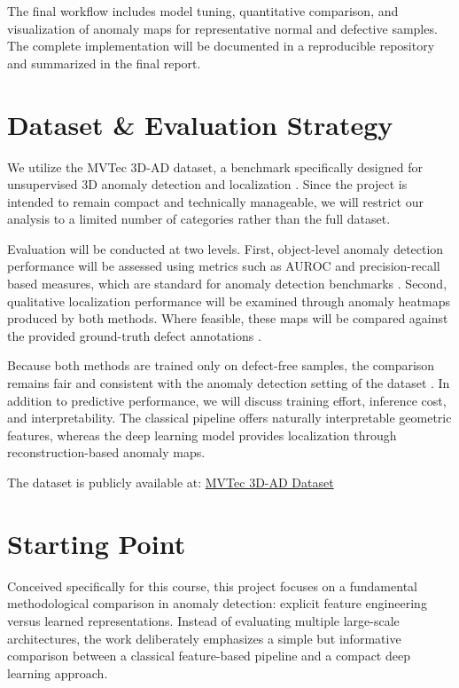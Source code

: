 The final workflow includes model tuning, quantitative comparison, and visualization of anomaly maps for representative normal and defective samples. The complete implementation will be documented in a reproducible repository and summarized in the final report.

\section{Dataset \& Evaluation Strategy}

We utilize the MVTec 3D-AD dataset, a benchmark specifically designed for unsupervised 3D anomaly detection and localization \cite{bergmann2022mvtec3d}. Since the project is intended to remain compact and technically manageable, we will restrict our analysis to a limited number of categories rather than the full dataset.

Evaluation will be conducted at two levels. First, object-level anomaly detection performance will be assessed using metrics such as AUROC and precision-recall based measures, which are standard for anomaly detection benchmarks \cite{bergmann2019mvtec,bergmann2022mvtec3d}. Second, qualitative localization performance will be examined through anomaly heatmaps produced by both methods. Where feasible, these maps will be compared against the provided ground-truth defect annotations \cite{bergmann2022mvtec3d}.

Because both methods are trained only on defect-free samples, the comparison remains fair and consistent with the anomaly detection setting of the dataset \cite{bergmann2022mvtec3d}. In addition to predictive performance, we will discuss training effort, inference cost, and interpretability. The classical pipeline offers naturally interpretable geometric features, whereas the deep learning model provides localization through reconstruction-based anomaly maps.

The dataset is publicly available at:
\href{https://www.mvtec.com/company/research/datasets/mvtec-3d-ad}{MVTec 3D-AD Dataset}
\section{Starting Point}

Conceived specifically for this course, this project focuses on a fundamental methodological comparison in anomaly detection: explicit feature engineering versus learned representations. Instead of evaluating multiple large-scale architectures, the work deliberately emphasizes a simple but informative comparison between a classical feature-based pipeline and a compact deep learning approach.

